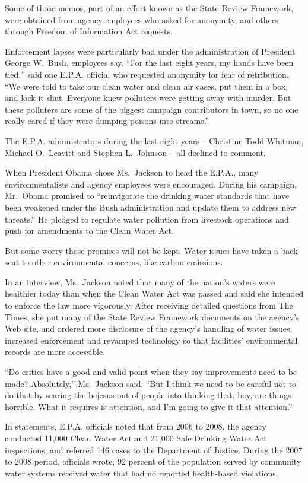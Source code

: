 ﻿\documentclass[12pt]{article}
\begin{document}
Some of those memos, part of an effort known as the State Review Framework, were obtained from
agency employees who asked for anonymity, and others through Freedom of Information Act requests.

Enforcement lapses\cite{lapse} were particularly bad under the administration of President George
W.~Bush, employees say. ``For the last eight years, my hands have been tied,'' said one E.P.A.
official who requested anonymity for fear of retribution. ``We were told to take our clean water and
clean air cases, put them in a box, and lock it shut. Everyone knew polluters were getting away with
murder. But these polluters are some of the biggest campaign contributors in town, so no one really
cared if they were dumping poisons into streams.''

The E.P.A. administrators during the last eight years -- Christine Todd Whitman, Michael O.~Leavitt
and Stephen L.~Johnson -- all declined to comment.

When President Obama chose Ms.~Jackson to head the E.P.A., many environmentalists and agency
employees were encouraged. During his campaign, Mr.~Obama promised to ``reinvigorate the drinking
water standards that have been weakened under the Bush administration and update them to address new
threats.'' He pledged to regulate water pollution from livestock operations and push for amendments
to the Clean Water Act.

But some worry those promises will not be kept. Water issues have taken a back seat to other
environmental concerns, like carbon emissions.

In an interview, Ms.~Jackson noted that many of the nation's waters were healthier today than when
the Clean Water Act was passed and said she intended to enforce the law more vigorously. After
receiving detailed questions from The Times, she put many of the State Review Framework documents on
the agency's Web site, and ordered more disclosure of the agency's handling of water issues,
increased enforcement and revamped technology so that facilities' environmental records are more
accessible.

``Do critics have a good and valid point when they say improvements need to be made? Absolutely,''
Ms.~Jackson said. ``But I think we need to be careful not to do that by scaring the bejesus out of
people into thinking that, boy, are things horrible. What it requires is attention, and I'm going to
give it that attention.''

In statements, E.P.A. officials noted that from 2006 to 2008, the agency conducted 11,000 Clean
Water Act and 21,000 Safe Drinking Water Act inspections, and referred 146 cases to the Department
of Justice. During the 2007 to 2008 period, officials wrote, 92 percent of the population served by
community water systems received water that had no reported health-based violations.
\end{document}
